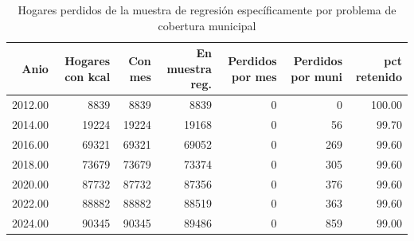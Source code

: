 \begin{table}[ht]
\centering
\caption{Hogares perdidos de la muestra de regresión específicamente por problema de cobertura municipal} 
\label{tab:muni_M8_impacto_muestra_regresion}
\begin{tabular}{rrrrrrr}
  \toprule
Anio & Hogares con kcal & Con mes & En muestra reg. & Perdidos por mes & Perdidos por muni & pct retenido \\ 
  \midrule
2012.00 & 8839 & 8839 & 8839 &   0 &   0 & 100.00 \\ 
  2014.00 & 19224 & 19224 & 19168 &   0 &  56 & 99.70 \\ 
  2016.00 & 69321 & 69321 & 69052 &   0 & 269 & 99.60 \\ 
  2018.00 & 73679 & 73679 & 73374 &   0 & 305 & 99.60 \\ 
  2020.00 & 87732 & 87732 & 87356 &   0 & 376 & 99.60 \\ 
  2022.00 & 88882 & 88882 & 88519 &   0 & 363 & 99.60 \\ 
  2024.00 & 90345 & 90345 & 89486 &   0 & 859 & 99.00 \\ 
   \bottomrule
\end{tabular}
\end{table}
